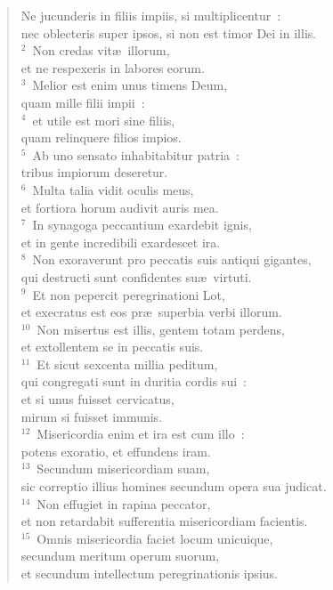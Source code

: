 \begin{flushleft}\begin{verse}\vspace{-19pt}\hspace{6pt}Ne jucunderis in filiis impiis, si multiplicentur~:\\\hspace{6pt} nec oblecteris super ipsos, si non est timor Dei in illis.\\
${}^{2}$~Non credas vit\ae\ illorum,\\ et ne respexeris in labores eorum.\\
${}^{3}$~Melior est enim unus timens Deum,\\ quam mille filii impii~:\\
${}^{4}$~et utile est mori sine filiis,\\ quam relinquere filios impios.\\
${}^{5}$~Ab uno sensato inhabitabitur patria~:\\ tribus impiorum deseretur.\\
${}^{6}$~Multa talia vidit oculis meus,\\ et fortiora horum audivit auris mea.\\
${}^{7}$~In synagoga peccantium exardebit ignis,\\ et in gente incredibili exardescet ira.\\
${}^{8}$~Non exoraverunt pro peccatis suis antiqui gigantes,\\ qui destructi sunt confidentes su\ae\ virtuti.\\
${}^{9}$~Et non pepercit peregrinationi Lot,\\ et execratus est eos pr\ae\ superbia verbi illorum.\\
${}^{10}$~Non misertus est illis, gentem totam perdens,\\ et extollentem se in peccatis suis.\\
${}^{11}$~Et sicut sexcenta millia peditum,\\ qui congregati sunt in duritia cordis sui~:\\ et si unus fuisset cervicatus,\\ mirum si fuisset immunis.\\
${}^{12}$~Misericordia enim et ira est cum illo~:\\ potens exoratio, et effundens iram.\\
${}^{13}$~Secundum misericordiam suam,\\ sic correptio illius homines secundum opera sua judicat.\\
${}^{14}$~Non effugiet in rapina peccator,\\ et non retardabit sufferentia misericordiam facientis.\\
${}^{15}$~Omnis misericordia faciet locum unicuique,\\ secundum meritum operum suorum,\\ et secundum intellectum peregrinationis ipsius.\end{verse}\end{flushleft}


